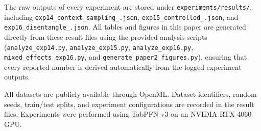 \documentclass[11pt,a4paper]{article}
\begin{document}
The raw outputs of every experiment are stored under
\texttt{experiments/results/}, including
\texttt{exp14\_\allowbreak context\_\allowbreak sampling\_\allowbreak*.json},
\texttt{exp15\_\allowbreak controlled\_\allowbreak*.json}, and
\texttt{exp16\_\allowbreak disentangle\_\allowbreak*.json}. All tables and
figures in this paper are generated directly from these result files using the
provided analysis scripts
(\texttt{analyze\_\allowbreak exp14.py}, \texttt{analyze\_\allowbreak exp15.py},
\texttt{analyze\_\allowbreak exp16.py},
\texttt{mixed\_\allowbreak effects\_\allowbreak exp16.py}, and
\texttt{generate\_\allowbreak paper2\_\allowbreak figures.py}), ensuring that
every reported number is derived automatically from the logged experiment
outputs.

All datasets are publicly available through OpenML. Dataset identifiers,
random seeds, train/test splits, and experiment configurations are recorded in
the result files. Experiments were performed using TabPFN v3 on an NVIDIA RTX
4060 GPU.
\end{document}
